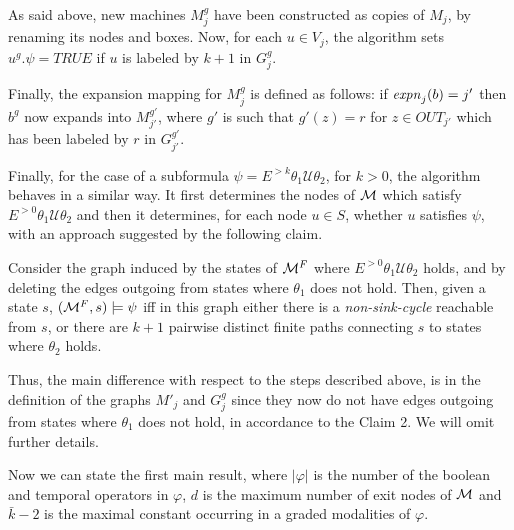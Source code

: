 \documentclass[letterpaper,twocolumn,10pt]{article}
\def    \U          {\mathcal{U}}
\def    \M          {{\cal M}}
\begin{document}
As said above,  new machines  $M_j^g$ have been constructed as copies of  $M_j$, by renaming its nodes and boxes.
Now, for each $u \in V_j$, the algorithm sets $u^g.\psi=TRUE$ if $u$ is labeled by $k+1$ in $G_j^g$.


Finally, the expansion mapping for $M_j^g$ is defined as follows: if $\mathit{expn}_j(b)=j'$ then $b^g$
now expands into $M_{j'}^{g'}$, where $g'$ is such that  $g'(z)=r$  for $z \in OUT_{j'}$ which has been labeled by $r$ in
$G_{j'}^{g'}$.






Finally, for the case of a subformula $\psi =E^{>k} \theta_1 \U \theta_2$, for $k>0$, the algorithm
behaves in a similar way.
It first determines the nodes of $\M$ which satisfy
$E^{>0} \theta_1 \U \theta_2$  and then it
 determines, for  each node $u\in S$, whether $u$ satisfies $\psi$,
with an   approach suggested by the following claim.

Consider  the graph induced by the states of $\M^F$ where $E^{>0} \theta_1\U \theta_2$   holds,
and by deleting the edges outgoing from states
where $\theta_1$ does not hold.
Then, given a state $s $, $(\M^F, s)
\models \psi$   iff in this graph
either there is a \emph{non-sink-cycle} reachable from $s$, or
there are $k+1$ pairwise distinct finite paths connecting $s$ to
states where $\theta_2$  holds.

Thus, the main difference with respect to the steps described above, is in the definition of
the graphs $M'_j$ and $G_j^g$ since they now do not have edges  outgoing from states
where $\theta_1$ does not hold, in accordance to the Claim 2.
We will omit further details.



Now we can state the first main result,
where $|\varphi|$ is  the number of the boolean and temporal operators in  $\varphi$,
 $d$ is the maximum number of exit
nodes of $\M$ and $\bar k -2$ is the maximal constant occurring in a graded modalities of $\varphi$.
\end{document}
